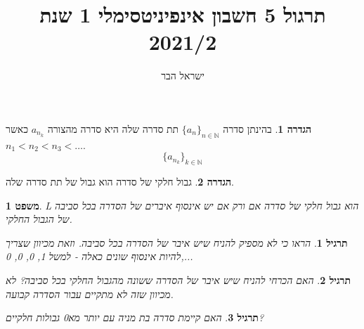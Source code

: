 \documentclass{article}
\begin{document}
\title{תרגול 5 חשבון אינפיניטסימלי 1 שנת 2021/2}
\author{ישראל הבר}
\maketitle

\newtheorem{theorem}{משפט}
\newtheorem{exercise}{תרגיל}
\newtheorem{homeexercise}{תרגיל לבית}
\newtheorem{example}{דוגמה}
\theoremstyle{definition}
\newtheorem{definition}{הגדרה}
\newtheorem{notation}{סימון}
\newtheorem{claim}{טענה}
\newtheorem{comment}{\emph{הערה}}
\renewcommand\qedsymbol{$\blacksquare$}
\newcommand{\limtoinfty}{\underset{n\rightarrow\infty}{\lim}}
\newcommand{\limsuptoinfty}{\underset{n\rightarrow\infty}{\limsup}}
\newcommand{\liminftoinfty}{\underset{n\rightarrow\infty}{\liminf}}
\newcommand{\limtop}{\underset{-}{\lim}}
\newcommand{\limbottom}{\overset{-}{\lim}}
\newcommand{\goesto}{\underset{n\rightarrow\infty}{\longrightarrow}}
\newcommand{\goesfrom}{\underset{n\rightarrow\infty}{\longleftarrow}}
\newcommand{\series}[2]{\{#1\}_{#2\in\mathbb{N}}}

\begin{definition}	
בהינתן סדרה 
$\series{a_n}{n}$ 
תת סדרה שלה היא סדרה מהצורה 
$a_{n_k}$ 
כאשר 
$n_1<n_2<n_3<\dots$.
\[\series{a_{n_k}}{k}\]
\end{definition}

\begin{definition}
גבול חלקי של סדרה הוא גבול של תת סדרה שלה.
\end{definition}

\begin{comment}
אם סדרה מתכנסת אז הגבול החלקי היחיד שלה הוא הגבול עצמו.
\end{comment}

\begin{theorem}
L הוא גבול חלקי של סדרה אם ורק אם 
יש אינסוף איברים של הסדרה בכל סביבה של הגבול החלקי.
\end{theorem}

\begin{exercise}
הראו כי לא מספיק להניח שיש איבר של הסדרה בכל סביבה. וזאת מכיוון שצריך להיות אינסוף שונים כאלה - למשל 1, 0, 0, 0,...
\end{exercise}

\begin{exercise}
האם הכרחי להניח שיש איבר של הסדרה ששונה מהגבול החלקי בכל סביבה? לא מכיוון שזה לא מתקיים עבור הסדרה קבועה. 
\end{exercise}

\begin{exercise}
האם קיימת סדרה בת מניה עם יותר מא0 גבולות חלקיים?
\end{exercise}
\end{document}
